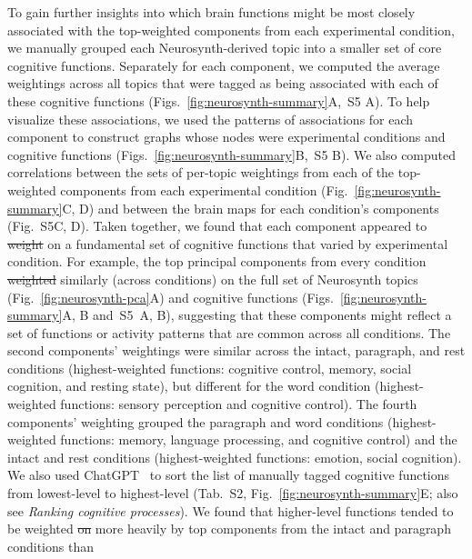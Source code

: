 \documentclass[english, 11pt]{article}
\newcommand{\neurosynthFull}{S5}
\newcommand{\topicTags}{S2}
\providecommand{\DIFaddtex}[1]{{\protect\color{blue}\uwave{#1}}} %
\providecommand{\DIFdeltex}[1]{{\protect\color{red}\sout{#1}}}                      %
\providecommand{\DIFaddbegin}{} %
\providecommand{\DIFaddend}{} %
\providecommand{\DIFdelbegin}{} %
\providecommand{\DIFdelend}{} %
\providecommand{\DIFadd}[1]{\texorpdfstring{\DIFaddtex{#1}}{#1}} %
\providecommand{\DIFdel}[1]{\texorpdfstring{\DIFdeltex{#1}}{}} %
\newcommand{\DIFscaledelfig}{0.5}
\newlength{\DIFdelgraphicswidth} %
\newlength{\DIFdelgraphicsheight} %
\newcommand{\DIFaddincludegraphics}[2][]{{\color{blue}\fbox{\DIFOincludegraphics[#1]{#2}}}} %
\newcommand{\DIFdelincludegraphics}[2][]{%
\sbox{\DIFdelgraphicsbox}{\DIFOincludegraphics[#1]{#2}}%
\settoboxwidth{\DIFdelgraphicswidth}{\DIFdelgraphicsbox} %
\settoboxtotalheight{\DIFdelgraphicsheight}{\DIFdelgraphicsbox} %
\scalebox{\DIFscaledelfig}{%
\parbox[b]{\DIFdelgraphicswidth}{\usebox{\DIFdelgraphicsbox}\\[-\baselineskip] \rule{\DIFdelgraphicswidth}{0em}}\llap{\resizebox{\DIFdelgraphicswidth}{\DIFdelgraphicsheight}{%
\setlength{\unitlength}{\DIFdelgraphicswidth}%
\begin{picture}(1,1)%
\thicklines\linethickness{2pt} %
{\color[rgb]{1,0,0}\put(0,0){\framebox(1,1){}}}%
{\color[rgb]{1,0,0}\put(0,0){\line( 1,1){1}}}%
{\color[rgb]{1,0,0}\put(0,1){\line(1,-1){1}}}%
\end{picture}%
}\hspace*{3pt}}} %
} %
\DeclareRobustCommand{\DIFaddbegin}{\DIFOaddbegin \let\includegraphics\DIFaddincludegraphics} %
\DeclareRobustCommand{\DIFaddend}{\DIFOaddend \let\includegraphics\DIFOincludegraphics} %
\DeclareRobustCommand{\DIFdelbegin}{\DIFOdelbegin \let\includegraphics\DIFdelincludegraphics} %
\DeclareRobustCommand{\DIFdelend}{\DIFOaddend \let\includegraphics\DIFOincludegraphics} %
\begin{document}
To gain further insights into which brain functions might be most closely
associated with the top-weighted components from each experimental condition,
we manually grouped each Neurosynth-derived topic into a smaller set of core
cognitive functions. Separately for each component, we computed the average
weightings across all topics that were tagged as being associated with each of
these cognitive functions (Figs.~\ref{fig:neurosynth-summary}A,~\neurosynthFull
A). To help visualize these associations, we used the patterns of associations
for each component to construct graphs whose nodes were experimental conditions
and cognitive functions (Figs.~\ref{fig:neurosynth-summary}B,~\neurosynthFull
B). We also computed correlations between the sets of per-topic weightings from
each of the top-weighted components from each experimental condition
(Fig.~\ref{fig:neurosynth-summary}C, D) and between the brain maps for each
condition's components (Fig.~\neurosynthFull C, D). Taken together, we found
that each component appeared to \DIFdelbegin \DIFdel{weight }\DIFdelend \DIFaddbegin \DIFadd{weigh }\DIFaddend on a fundamental set of cognitive
functions that varied by experimental condition. For example, the top principal
components from every condition \DIFdelbegin \DIFdel{weighted }\DIFdelend \DIFaddbegin \DIFadd{weighed }\DIFaddend similarly (across conditions) on the
full set of Neurosynth topics (Fig.~\ref{fig:neurosynth-pca}A) and cognitive
functions (Figs.~\ref{fig:neurosynth-summary}A, B and~\neurosynthFull~A, B),
suggesting that these components might reflect a set of functions or activity
patterns that are common across all conditions. The second components'
weightings were similar across the intact, paragraph, and rest conditions
(highest-weighted functions: cognitive control, memory, social cognition, and
resting state), but different for the word condition (highest-weighted
functions: sensory perception and cognitive control). The fourth components'
weighting grouped the paragraph and word conditions (highest-weighted
functions: memory, language processing, and cognitive control) and the intact
and rest conditions (highest-weighted functions: emotion, social cognition). We
also used ChatGPT~\citep{ChatGPT} to sort the list of manually tagged cognitive
functions from lowest-level to highest-level (Tab.~\topicTags,
Fig.~\ref{fig:neurosynth-summary}E; also see \textit{Ranking cognitive
processes}). We found that higher-level functions tended to be weighted \DIFdelbegin \DIFdel{on }\DIFdelend more
heavily by top components from the intact and paragraph conditions than
\end{document}
